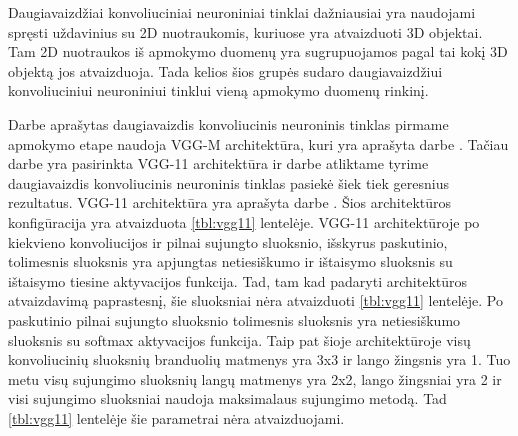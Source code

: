 Daugiavaizdžiai konvoliuciniai neuroniniai tinklai dažniausiai yra naudojami spręsti uždavinius su 2D nuotraukomis, kuriuose yra atvaizduoti 3D objektai. Tam 2D nuotraukos iš apmokymo duomenų yra sugrupuojamos pagal tai kokį 3D objektą jos atvaizduoja. Tada kelios šios grupės sudaro daugiavaizdžiui konvoliuciniui neuroniniui tinklui vieną apmokymo duomenų rinkinį.

Darbe \cite{cnnExp1} aprašytas daugiavaizdis konvoliucinis neuroninis tinklas pirmame apmokymo etape naudoja VGG-M architektūra, kuri yra aprašyta darbe \cite{vggM}. Tačiau darbe \cite{cnnExp2} yra pasirinkta VGG-11 architektūra ir darbe \cite{cnnExp2} atliktame tyrime  daugiavaizdis konvoliucinis neuroninis tinklas pasiekė šiek tiek geresnius rezultatus. VGG-11 architektūra yra aprašyta darbe \cite{vgg11}. Šios architektūros konfigūracija yra atvaizduota \ref{tbl:vgg11} lentelėje. VGG-11 architektūroje po kiekvieno konvoliucijos ir pilnai sujungto sluoksnio, išskyrus paskutinio, tolimesnis sluoksnis yra apjungtas netiesiškumo ir ištaisymo sluoksnis su ištaisymo tiesine aktyvacijos funkcija. Tad, tam kad padaryti architektūros atvaizdavimą paprastesnį, šie sluoksniai nėra atvaizduoti \ref{tbl:vgg11} lentelėje. Po paskutinio pilnai sujungto sluoksnio tolimesnis sluoksnis yra netiesiškumo sluoksnis su softmax aktyvacijos funkcija. Taip pat šioje architektūroje visų konvoliucinių sluoksnių branduolių matmenys yra 3x3 ir lango žingsnis yra 1. Tuo metu visų sujungimo sluoksnių langų matmenys yra 2x2, lango žingsniai yra 2 ir visi sujungimo sluoksniai naudoja maksimalaus sujungimo metodą. Tad \ref{tbl:vgg11} lentelėje šie parametrai nėra atvaizduojami.

